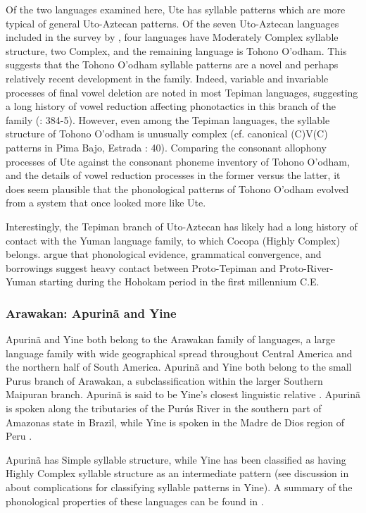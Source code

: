   Of the two languages examined here, Ute has syllable patterns which are more typical of general Uto-Aztecan patterns. Of the seven Uto-Aztecan languages included in the survey by \citet{Maddieson2013a}, four languages have Moderately Complex syllable structure, two Complex, and the remaining language is Tohono O’odham. This suggests that the Tohono O’odham syllable patterns are a novel and perhaps relatively recent development in the family. Indeed, variable and invariable processes of final vowel deletion are noted in most Tepiman languages, suggesting a long history of vowel reduction affecting phonotactics in this branch of the family (\citealt{ShaulHill1998}: 384-5). However, even among the Tepiman languages, the syllable structure of Tohono O’odham is unusually complex (cf. canonical (C)V(C) patterns in Pima Bajo, Estrada \citealt{Fernández2014}: 40). Comparing the consonant allophony processes of Ute against the consonant phoneme inventory of Tohono O’odham, and the details of vowel reduction processes in the former versus the latter, it does seem plausible that the phonological patterns of Tohono O’odham evolved from a system that once looked more like Ute.

  Interestingly, the Tepiman branch of Uto-Aztecan has likely had a long history of contact with the Yuman language family, to which Cocopa (Highly Complex) belongs. \citet{ShaulHill1998} argue that phonological evidence, grammatical convergence, and borrowings suggest heavy contact between Proto-Tepiman and Proto-River-Yuman starting during the Hohokam period in the first millennium C.E.

\subsubsection{{Arawakan:} {Apurinã} {and} {Yine}}\label{sec:8.4.3.2}

  Apurinã and Yine both belong to the Arawakan family of languages, a large language family with wide geographical spread throughout Central America and the northern half of South America. Apurinã and Yine both belong to the small Purus branch of Arawakan, a subclassification within the larger Southern Maipuran branch. Apurinã is said to be Yine’s closest linguistic relative \citep{Facundes2002}. Apurinã is spoken along the tributaries of the Purús River in the southern part of Amazonas state in Brazil, while Yine is spoken in the Madre de Dios region of Peru \citep{Aikhenvald1999}.

  Apurinã has Simple syllable structure, while Yine has been classified as having Highly Complex syllable structure as an intermediate pattern (see discussion in  about complications for classifying syllable patterns in Yine). A summary of the phonological properties of these languages can be found in .

